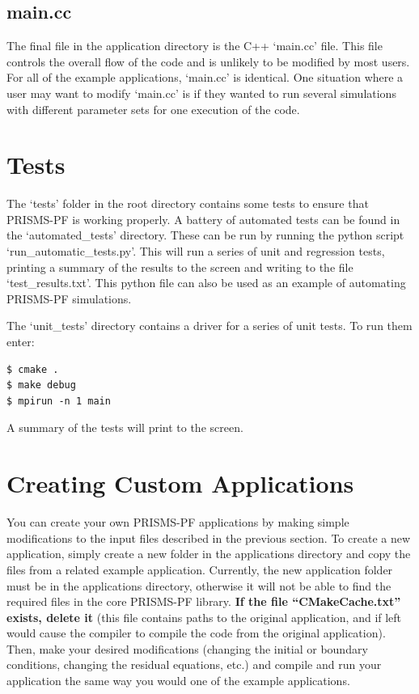 \documentclass[10pt]{article} %
\begin{document}
\subsection{main.cc}
The final file in the application directory is the C++ `main.cc' file. This file controls the overall flow of the code and is unlikely to be modified by most users. For all of the example applications, `main.cc' is identical. One situation where a user may want to modify `main.cc' is if they wanted to run several simulations with different parameter sets for one execution of the code.

\section{Tests}
The `tests' folder in the root directory contains some tests to ensure that PRISMS-PF is working properly. A battery of automated tests can be found in the `automated\_tests' directory. These can be run by running the python script `run\_automatic\_tests.py'. This will run a series of unit and regression tests, printing a summary of the results to the screen and writing to the file `test\_results.txt'. This python file can also be used as an example of automating PRISMS-PF simulations.

The `unit\_tests' directory contains a driver for a series of unit tests. To run them enter:
\begin{lstlisting}
$ cmake . 
$ make debug 
$ mpirun -n 1 main 
\end{lstlisting}
A summary of the tests will print to the screen.

\section{Creating Custom Applications}
You can create your own PRISMS-PF applications by making simple modifications to the input files described in the previous section. To create a new application, simply create a new folder in the applications directory and copy the files from a related example application. Currently, the new application folder must be in the applications directory, otherwise it will not be able to find the required files in the core PRISMS-PF library. \textbf{If the file ``CMakeCache.txt'' exists, delete it} (this file contains paths to the original application, and if left would cause the compiler to compile the code from the original application). Then, make your desired modifications (changing the initial or boundary conditions, changing the residual equations, etc.) and compile and run your application the same way you would one of the example applications.
\end{document}
